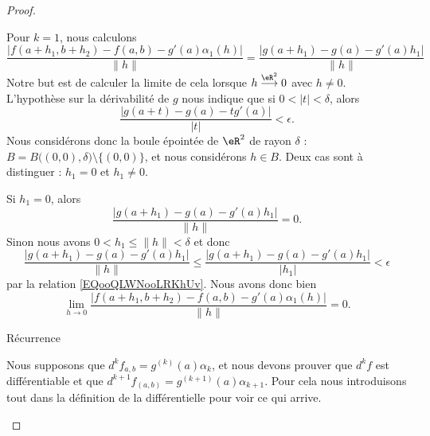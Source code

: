 \begin{proof}
\begin{subproof}
    Pour \( k=1\), nous calculons
    \begin{equation}
        \frac{ |f(a+h_1,b+h_2)-f(a,b)-g'(a)\alpha_1(h)| }{ \| h \| }=\frac{ |g(a+h_1)-g(a)-g'(a)h_1| }{ \| h \| }
    \end{equation}
    Notre but est de calculer la limite de cela lorsque \( h\stackrel{\eR^2}{\longrightarrow}0\) avec \( h\neq 0\). L'hypothèse sur la dérivabilité de \( g\) nous indique que si \( 0<| t |<\delta\), alors
    \begin{equation}        \label{EQooQLWNooLRKhUv}
        \frac{ | g(a+t)-g(a)-tg'(a) | }{ | t | }<\epsilon.
    \end{equation}
    Nous considérons donc la boule épointée de \( \eR^2\) de rayon \( \delta\) : \( B=B\big( (0,0),\delta \big)\setminus\{(0,0)\}\), et nous considérons \( h\in B\). Deux cas sont à distinguer : \( h_1=0\) et \( h_1\neq 0\). 

    Si \( h_1=0\), alors
    \begin{equation}
        \frac{ |g(a+h_1)-g(a)-g'(a)h_1| }{ \| h \| }=0.
    \end{equation}
    Sinon nous avons \( 0<h_1\leq\| h \|<\delta\) et donc
    \begin{equation}
        \frac{ |g(a+h_1)-g(a)-g'(a)h_1| }{ \| h \| }\leq\frac{ |g(a+h_1)-g(a)-g'(a)h_1| }{ | h_1 | }<\epsilon
    \end{equation}
    par la relation \eqref{EQooQLWNooLRKhUv}. Nous avons donc bien
    \begin{equation}
        \lim_{h\to 0}\frac{ |f(a+h_1,b+h_2)-f(a,b)-g'(a)\alpha_1(h)| }{ \| h \| }=0.
    \end{equation}

\item[Récurrence]

    Nous supposons que \( d^kf_{a,b}=g^{(k)}(a)\alpha_k\), et nous devons prouver que \( d^kf\) est différentiable et que \( d^{k+1}f_{(a,b)}=g^{(k+1)}(a)\alpha_{k+1}\). Pour cela nous introduisons tout dans la définition de la différentielle pour voir ce qui arrive.


\end{subproof}
\end{proof}
